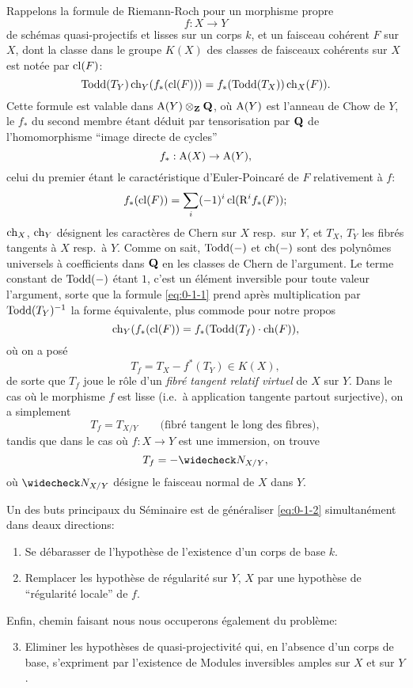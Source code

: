 Rappelons la formule de Riemann-Roch pour un morphisme propre 
\[
  f:X\to Y
\]
de schémas quasi-projectifs et lisses sur un corps $k$, et un faisceau cohérent $F$ sur $X$, dont la classe dans le groupe $K(X)$ des classes de faisceaux cohérents sur $X$ est notée par $\operatorname{cl}(F)$:
\begin{equation}\label{eq:0-1-1}
  \operatorname{Todd}(T_Y) \operatorname{ch}_Y(f_\ast(\operatorname{cl}(F))) = f_\ast (\operatorname{Todd}(T_X))\operatorname{ch}_X(F)) .
\end{equation}
Cette formule est valable dans $\operatorname{A}(Y)\otimes_{\mathbf{Z}}\mathbf{Q}$, où $\operatorname{A}(Y)$ est l'anneau de Chow de $Y$, le $f_\ast$ du second membre étant déduit par tensorisation par $\mathbf{Q}$ de l'homomorphisme ``image directe de cycles''
\[
  f_\ast:\operatorname{A}(X)\to \operatorname{A}(Y),
\]
celui du premier étant le caractéristique d'Euler-Poincaré de $F$ relativement à $f$:
\[
  f_\ast(\operatorname{cl}(F)) = \sum_i (-1)^i \operatorname{cl}(\mathrm{R}^i f_\ast(F));
\]
$\operatorname{ch}_X$, $\operatorname{ch}_Y$ désignent les caractères de Chern sur $X$ resp.~sur $Y$, et $T_X$, $T_Y$ les fibrés tangents à $X$ resp.~à $Y$. Comme on sait, $\operatorname{Todd}(-)$ et $\operatorname{ch}(-)$ sont des polynômes universels à coefficients dans $\mathbf{Q}$ en les classes de Chern de l'argument. Le terme constant de $\operatorname{Todd}(-)$ étant $1$, c'est un élément inversible pour toute valeur l'argument, sorte que la formule \eqref{eq:0-1-1} prend après multiplication par $\operatorname{Todd}(T_Y)^{-1}$ la forme équivalente, plus commode pour notre propos 
\begin{equation}\label{eq:0-1-2}
  \operatorname{ch}_Y(f_\ast(\operatorname{cl}(F)) = f_\ast(\operatorname{Todd}(T_f)\cdot \operatorname{ch}(F)) ,
\end{equation}
où on a posé 
\begin{equation}\label{eq:0-1-3}
  T_f = T_X-f^\ast(T_Y)\in K(X) ,
\end{equation}
de sorte que $T_f$ joue le rôle d'un \emph{fibré tangent relatif virtuel} de $X$ sur $Y$. Dans le cas où le morphisme $f$ est lisse (i.e.~à application tangente partout surjective), on a simplement 
\[
  T_f = T_{X/Y} \qquad\text{(fibré tangent le long des fibres)} ,
\]
tandis que dans le cas où $f:X\to Y$ est une immersion, on trouve 
\[
  T_f = -\widecheck N_{X/Y} ,
\]
où $\widecheck N_{X/Y}$ désigne le faisceau normal de $X$ dans $Y$. 

Un des buts principaux du Séminaire est de généraliser \eqref{eq:0-1-2} simultanément dans deaux directions:
\begin{enumerate}[\indent a)]
  \item Se débarasser de l'hypothèse de l'existence d'un corps de base $k$. 
  \item Remplacer les hypothèse de régularité sur $Y$, $X$ par une hypothèse de ``régularité locale'' de $f$. 
\end{enumerate}
Enfin, chemin faisant nous nous occuperons également du problème: 
\begin{enumerate}[\indent a)]
\setcounter{enumi}{2}
  \item Eliminer les hypothèses de quasi-projectivité qui, en l'absence d'un corps de base, s'expriment par l'existence de Modules inversibles amples sur $X$ et sur $Y$. 
\end{enumerate}





